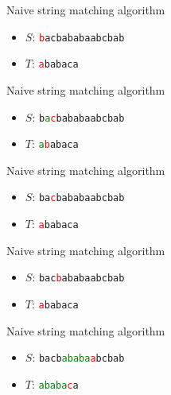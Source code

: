 \documentclass[12pt,t]{beamer}
\begin{document}
\begin{frame}{Naive string matching algorithm}
    \vspace{30pt}
    \begin{itemize}
        \item $S$: \texttt{\textcolor{red}{b}acbababaabcbab}
        \item $T$: \phantom{\texttt{}}\texttt{\textcolor{red}{a}babaca}
    \end{itemize}
\end{frame}
\begin{frame}{Naive string matching algorithm}
    \vspace{30pt}
    \begin{itemize}
        \item $S$: \texttt{b\textcolor{green}{a}\textcolor{red}{c}bababaabcbab}
        \item $T$: \texttt{\textcolor{green}{a}\textcolor{red}{b}abaca}
    \end{itemize}
\end{frame}
\begin{frame}{Naive string matching algorithm}
    \vspace{30pt}
    \begin{itemize}
        \item $S$: \texttt{ba\textcolor{red}{c}bababaabcbab}
        \item $T$: \texttt{\textcolor{red}{a}babaca}
    \end{itemize}
\end{frame}
\begin{frame}{Naive string matching algorithm}
    \vspace{30pt}
    \begin{itemize}
        \item $S$: \texttt{bac\textcolor{red}{b}ababaabcbab}
        \item $T$: \texttt{\textcolor{red}{a}babaca}
    \end{itemize}
\end{frame}
\begin{frame}{Naive string matching algorithm}
    \vspace{30pt}
    \begin{itemize}
        \item $S$: \texttt{bacb\textcolor{green}{ababa}\textcolor{red}{a}bcbab}
        \item $T$: \texttt{\textcolor{green}{ababa}\textcolor{red}{c}a}
    \end{itemize}
\end{frame}
\end{document}
